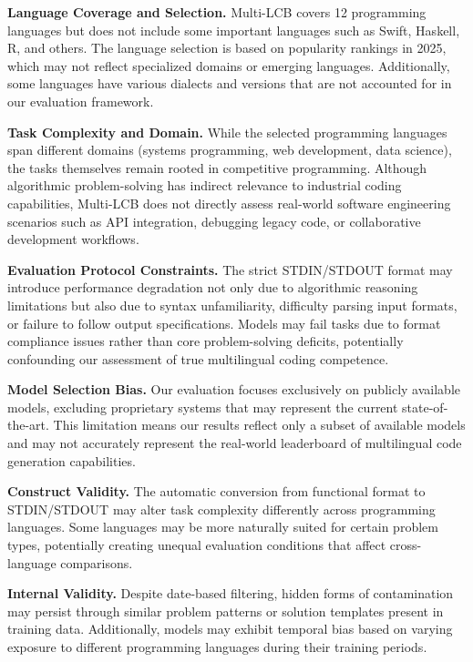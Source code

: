 \documentclass{llmxive}
\begin{document}
\textbf{Language Coverage and Selection.} 
Multi-LCB covers 12 programming languages but does not include some important languages such as Swift, Haskell, R, and others. The language selection is based on popularity rankings in 2025, which may not reflect specialized domains or emerging languages. Additionally, some languages have various dialects and versions that are not accounted for in our evaluation framework.

\textbf{Task Complexity and Domain.} 
While the selected programming languages span different domains (systems programming, web development, data science), the tasks themselves remain rooted in competitive programming. Although algorithmic problem-solving has indirect relevance to industrial coding capabilities, Multi-LCB does not directly assess real-world software engineering scenarios such as API integration, debugging legacy code, or collaborative development workflows.

\textbf{Evaluation Protocol Constraints.} 
The strict STDIN/STDOUT format may introduce performance degradation not only due to algorithmic reasoning limitations but also due to syntax unfamiliarity, difficulty parsing input formats, or failure to follow output specifications. Models may fail tasks due to format compliance issues rather than core problem-solving deficits, potentially confounding our assessment of true multilingual coding competence.

\textbf{Model Selection Bias.} 
Our evaluation focuses exclusively on publicly available models, excluding proprietary systems that may represent the current state-of-the-art. This limitation means our results reflect only a subset of available models and may not accurately represent the real-world leaderboard of multilingual code generation capabilities.


\textbf{Construct Validity.} 
The automatic conversion from functional format to STDIN/STDOUT may alter task complexity differently across programming languages. Some languages may be more naturally suited for certain problem types, potentially creating unequal evaluation conditions that affect cross-language comparisons.

\textbf{Internal Validity.} 
Despite date-based filtering, hidden forms of contamination may persist through similar problem patterns or solution templates present in training data. Additionally, models may exhibit temporal bias based on varying exposure to different programming languages during their training periods.
\end{document}
